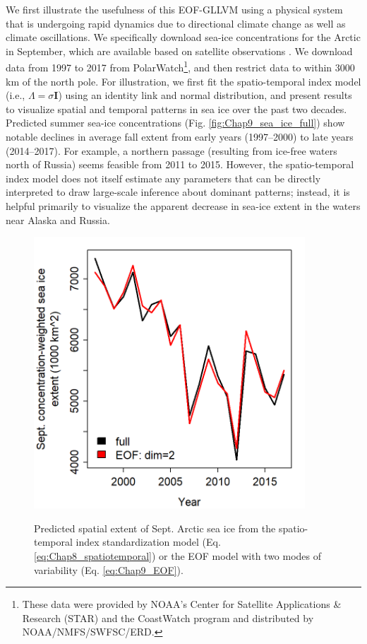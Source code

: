 We first illustrate the usefulness of this EOF-GLLVM using a physical system that is undergoing rapid dynamics due to directional climate change as well as climate oscillations.  We specifically download sea-ice concentrations for the Arctic in September, which are available based on satellite observations \cite{comiso_trends_2008}.  We download data from 1997 to 2017 from PolarWatch\footnote{These data were provided by NOAA's Center for Satellite Applications \& Research (STAR) and the CoastWatch program and distributed by NOAA/NMFS/SWFSC/ERD.}, and then restrict data to within 3000 km of the north pole.  For illustration, we first fit the spatio-temporal index model (i.e., \( \Lambda = \sigma \mathbf{I} \)) using an identity link and normal distribution, and present results to visualize spatial and temporal patterns in sea ice over the past two decades.  Predicted summer sea-ice concentrations (Fig. \ref{fig:Chap9_sea_ice_full}) show notable declines in average fall extent from early years (1997--2000) to late years (2014--2017).  For example, a northern passage (resulting from ice-free waters north of Russia) seems feasible from 2011 to 2015.  However, the spatio-temporal index model does not itself estimate any parameters that can be directly interpreted to draw large-scale inference about dominant patterns; instead, it is helpful primarily to visualize the apparent decrease in sea-ice extent in the waters near Alaska and Russia.   

\begin{figure}[!ht]
    \caption[Comparison of estimated sea ice extent]{Predicted spatial extent of Sept. Arctic sea ice from the spatio-temporal index standardization model (Eq. \ref{eq:Chap8_spatiotemporal}) or the EOF model with two modes of variability (Eq. \ref{eq:Chap9_EOF}).}
    \centering
    \includegraphics[width=4in]{Chap_9/sea_ice_extent.png}
    \label{fig:Chap9_sea_ice_extent}
\end{figure}


